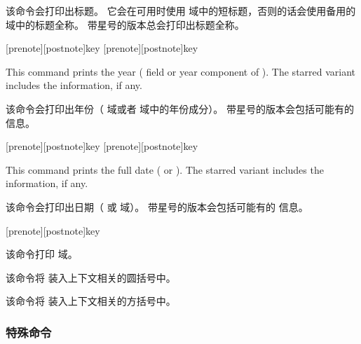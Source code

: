 \begin{ltxsyntax}

该命令会打印出标题。
它会在可用时使用  域中的短标题，否则的话会使用备用的  域中的标题全称。
带星号的版本总会打印出标题全称。

[prenote][postnote]{key}
[prenote][postnote]{key}

This command prints the year ( field or year component of ). The starred variant includes the  information, if any.

该命令会打印出年份（ 域或者  域中的年份成分）。
带星号的版本会包括可能有的  信息。

[prenote][postnote]{key}
[prenote][postnote]{key}

This command prints the full date ( or ). The starred variant includes the  information, if any.

该命令会打印出日期（ 或  域）。
带星号的版本会包括可能有的  信息。

[prenote][postnote]{key}


该命令打印  域。



该命令将  装入上下文相关的圆括号中。



该命令将  装入上下文相关的方括号中。

\end{ltxsyntax}

\subsubsection{特殊命令}%
\label{use:cit:spc}


